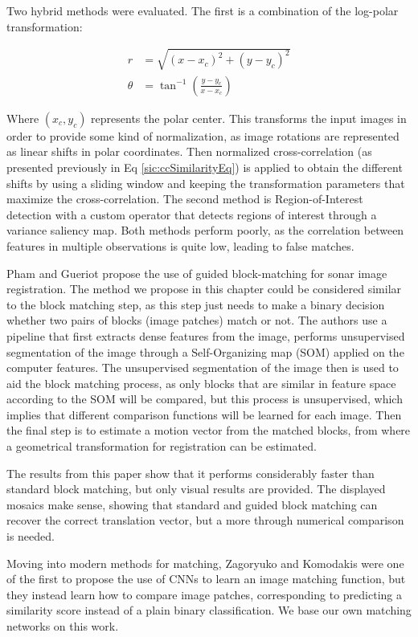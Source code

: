 Two hybrid methods were evaluated. The first is a combination of the log-polar transformation:

\begin{align}
	r 		&= \sqrt{(x - x_c)^2 + (y - y_c)^2}\\
	\theta 	&= \tan^{-1}\left ( \frac{y - y_c}{x - x_c} \right )
\end{align}

Where $(x_c, y_c)$ represents the polar center. This transforms the input images in order to provide some kind of normalization, as image rotations are represented as linear shifts in polar coordinates. Then normalized cross-correlation (as presented previously in Eq \ref{sic:ccSimilarityEq}) is applied to obtain the different shifts by using a sliding window and keeping the transformation parameters that maximize the cross-correlation. The second method is Region-of-Interest detection with a custom operator that detects regions of interest through a variance saliency map. Both methods perform poorly, as the correlation between features in multiple observations is quite low, leading to false matches.

Pham and Gueriot \cite{pham2013guided} propose the use of guided block-matching for sonar image registration. The method we propose in this chapter could be considered similar to the block matching step, as this step just needs to make a binary decision whether two pairs of blocks (image patches) match or not. The authors use a pipeline that first extracts dense features from the image, performs unsupervised segmentation of the image through a Self-Organizing map (SOM) applied on the computer features.
The unsupervised segmentation of the image then is used to aid the block matching process, as only blocks that are similar in feature space according to the SOM will be compared, but this process is unsupervised, which implies that different comparison functions will be learned for each image. Then the final step is to estimate a motion vector from the matched blocks, from where a geometrical transformation for registration can be estimated.

The results from this paper show that it performs considerably faster than standard block matching, but only visual results are provided. The displayed mosaics make sense, showing that standard and guided block matching can recover the correct translation vector, but a more through numerical comparison is needed.

Moving into modern methods for matching, Zagoryuko and Komodakis \cite{zagoruyko2015learning} were one of the first to propose the use of CNNs to learn an image matching function, but they instead learn how to compare image patches, corresponding to predicting a similarity score instead of a plain binary classification. We base our own matching networks on this work.

